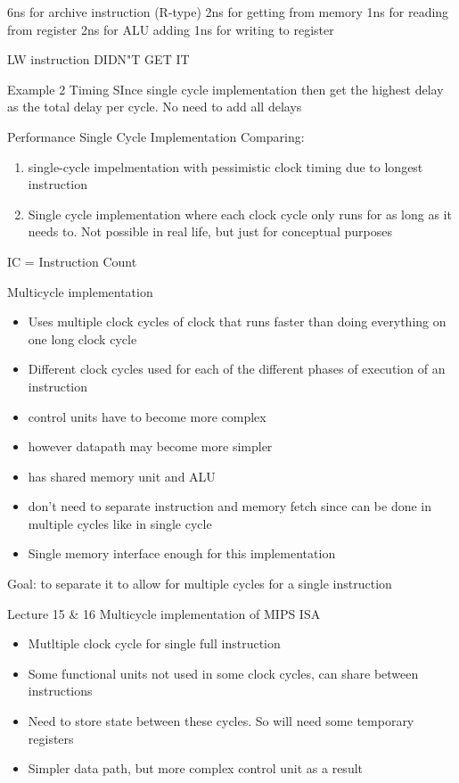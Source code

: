 \documentclass{article}
\begin{document}
		6ns for archive instruction (R-type)
			2ns for getting from memory
			1ns for reading from register
			2ns for ALU adding
			1ns for writing to register

		LW instruction
			DIDN"T GET IT

		Example 2
			Timing
				SInce single cycle implementation then get the highest delay as the total delay per cycle. No need to add all delays

		Performance Single Cycle Implementation
			Comparing:
			\begin{enumerate}
				\item single-cycle impelmentation with pessimistic clock timing due to longest instruction
				\item Single cycle implementation where each clock cycle only runs for as long as it needs to. Not possible in real life, but just for conceptual purposes
			\end{enumerate}

			IC = Instruction Count

		Multicycle implementation
		\begin{itemize}
			\item Uses multiple clock cycles of clock that runs faster than doing everything on one long clock cycle
			\item Different clock cycles used for each of the different phases of execution of an instruction
			\item control units have to become more complex
			\item however datapath may become more simpler
		\end{itemize}

		\begin{itemize}
			\item has shared memory unit and ALU
			\item don't need to separate instruction and memory fetch since can be done in multiple cycles like in single cycle
			\item Single memory interface enough for this implementation
		\end{itemize}

			Goal: to separate it to allow for multiple cycles for a single instruction

Lecture 15 \& 16
	Multicycle implementation of MIPS ISA
		\begin{itemize}
			\item Mutltiple clock cycle for single full instruction
			\item Some functional units not used in some clock cycles, can share between instructions
			\item Need to store state between these cycles. So will need some temporary registers
			\item Simpler data path, but more complex control unit as a result
		\end{itemize}
\end{document}
